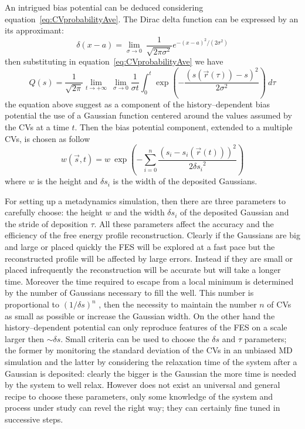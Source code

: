 An intrigued bias potential can be deduced considering equation~\eqref{eq:CVprobabilityAve}. The Dirac delta function can be expressed by an its approximant:  
\begin{equation*}
	\delta(x-a) = \lim_{\sigma\to 0}\ \frac{1}{\sqrt{2 \pi \sigma^2}}e^{-(x-a)^2/(2\sigma^2)}
\end{equation*}
then substituting in equation~\eqref{eq:CVprobabilityAve} we have
\begin{equation*}
	Q(s) = \frac{1}{\sqrt{2\pi}}\lim_{t\to +\infty}\ \lim_{\sigma\to 0} \frac{1}{\sigma t}\int_0^t \exp{ \left ( -\frac{(s(\vec r(\tau))-s)^2}{2\sigma^2} \right )} \ d\tau
\end{equation*}
the equation above suggest as a component of the history--dependent bias potential the use of a Gaussian function centered around the values assumed by the \acp{CV} at a time $t$. Then the bias potential component, extended to a multiple \acp{CV}, is chosen as follow
\begin{equation*}
	w(\vec s, t) = w\ \exp\left ({-\sum_{i=0}^n \frac{(s_i - s_i(\vec r(t)))^2}{2{\delta s_i}^2} }\right )
\end{equation*}
where $w$ is the height and $\delta s_i$ is the width of the deposited Gaussians.

For setting up a metadynamics simulation, then there are three parameters to carefully choose: the height $w$ and the width $\delta s_i$ of the deposited Gaussian and the stride of deposition $\tau$. All these parameters affect the accuracy and the efficiency of the free energy profile reconstruction. Clearly if the Gaussians are big and large or placed quickly the \ac{FES} will be explored at a fast pace but the reconstructed profile will be affected by large errors. Instead if they are small or placed infrequently the reconstruction will be accurate but will take a longer time. Moreover the time required to escape from a local minimum is determined by the number of Gaussians necessary to fill the well. This number is proportional to $(1/\delta s)^n$ \cite{MetadReview}, then the necessity to maintain the number $n$ of \acp{CV} as small as possible or increase the Gaussian width. On the other hand the history--dependent potential can only reproduce features of the \ac{FES} on a scale larger then $\sim \delta s$. Small criteria can be used to choose the $\delta s$ and $\tau$ parameters; the former by monitoring the standard deviation of the \acp{CV} in an unbiased \ac{MD} simulation and the latter by considering the relaxation time of the system after a Gaussian is deposited: clearly the bigger is the Gaussian the more time is needed by the system to well relax. However does not exist an universal and general recipe to choose these parameters, only some knowledge of the system and process under study can revel the right way; they can certainly fine tuned in successive steps.

